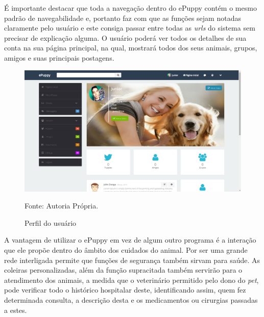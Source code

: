 É importante destacar que toda a navegação dentro do ePuppy contém o mesmo padrão de navegabilidade e, portanto faz com que as funções sejam notadas claramente pelo usuário e este consiga passar entre todas as {\it urls} do sistema sem precisar de explicação alguma. O usuário poderá ver todos os detalhes de sua conta na sua página principal, na qual, mostrará todos dos seus animais, grupos, amigos e suas principais postagens.

\begin{figure}[h!]
	\center	\includegraphics[scale=0.33
	]{imagens/perfil}
	\caption{Perfil do usuário}
	Fonte: Autoria Própria.
	\label{Rotulo}
\end{figure}

A vantagem de utilizar o ePuppy em vez de algum outro programa é a interação que ele propõe dentro do âmbito dos cuidados do animal. Por ser uma grande rede interligada permite que funções de segurança também sirvam para saúde. As coleiras personalizadas, além da função supracitada também servirão para o atendimento dos animais, a medida que o veterinário permitido pelo dono do {\it pet}, pode verificar todo o histórico hospitalar deste, identificando assim, quem fez determinada consulta, a descrição desta e os medicamentos ou cirurgias passadas a estes.

